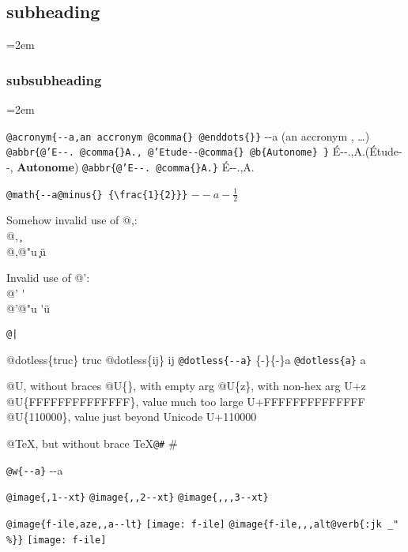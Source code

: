 \documentclass{book}
\newenvironment{GNUTexinfopreformatted}{%
  \par\begingroup\obeylines\obeyspaces\frenchspacing}{\endgroup}
\newcommand{\GNUTexinfoplaceholder}[1]{}
\newcommand{\GNUTexinfonopagebreakheading}[2]{\let\clearpage\relax \let\cleardoublepage\relax \let\thispagestyle\GNUTexinfoplaceholder #1{#2}}
\renewcommand{\includegraphics}[1]{\fbox{FIG \detokenize{#1}}}
\begin{document}
\GNUTexinfonopagebreakheading{\subsection*}{{subheading}}
\begin{GNUTexinfopreformatted}
\leftskip=2em \parskip=0pt \parindent=0pt \ttfamily%

\end{GNUTexinfopreformatted}
\GNUTexinfonopagebreakheading{\subsubsection*}{{subsubheading}}
\begin{GNUTexinfopreformatted}
\leftskip=2em \parskip=0pt \parindent=0pt \ttfamily%


\texttt{@acronym\{{-}{-}a,an accronym @comma\{\} @enddots\{\}\}} {-}{-}a (an accronym , \dots{})
\texttt{@abbr\{@'E{-}{-}. @comma\{\}A., @'Etude{-}{-}@comma\{\} @b\{Autonome\} \}} \'{E}{-}{-}.\@ ,A.\@ (\'{E}tude{-}{-}, \textbf{Autonome})
\texttt{@abbr\{@'E{-}{-}. @comma\{\}A.\}} \'{E}{-}{-}.\@ ,A.\@

\texttt{@math\{{-}{-}a@minus\{\} \{\textbackslash{}frac\{1\}\{2\}\}\}} $--a- {\frac{1}{2}}$




Somehow invalid use of @,:\leavevmode{}\\
@, \c{}
\leavevmode{}\\
@,@"u \c{}\"{u}

Invalid use of @':\leavevmode{}\\
@' \'{}
\leavevmode{}\\
@'@"u \'{}\"{u}

\texttt{@|} 

@dotless\{truc\} truc
@dotless\{ij\} ij
\texttt{@dotless\{{-}{-}a\}} \{-\}\{-\}a
\texttt{@dotless\{a\}} a

@U, without braces @U\{\}, with empty arg 
@U\{z\}, with non-hex arg U+z
@U\{FFFFFFFFFFFFFF\}, value much too large U+FFFFFFFFFFFFFF
@U\{110000\}, value just beyond Unicode U+110000

@TeX, but without brace \TeX{}\texttt{@\#} \#

\texttt{@w\{{-}{-}a\}} \hbox{{-}{-}a}

\texttt{@image\{,1{-}{-}xt\}} 
\texttt{@image\{,,2{-}{-}xt\}} 
\texttt{@image\{,,,3{-}{-}xt\}} 

\texttt{@image\{f-ile,aze,,a{-}{-}lt\}} \texttt{[image: f-ile]}
\texttt{@image\{f-ile,,,alt@verb\{:jk \_" \%\@\}\}} \texttt{[image: f-ile]}


\end{GNUTexinfopreformatted}
\end{document}
